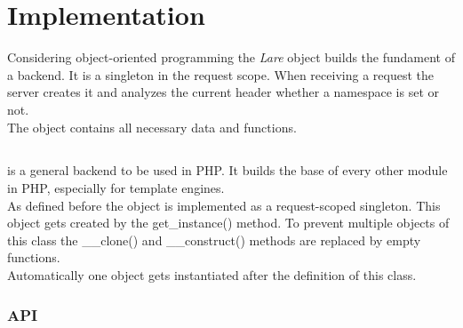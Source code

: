 \section{Implementation\label{chap:implementation}}

Considering object-oriented programming the \emph{Lare} object builds the fundament of a \lare{} backend.
It is a singleton in the request scope.
When receiving a request the server creates it and analyzes the current \http{} header whether a namespace is set or not.
\\
The \lare{} object contains all necessary data and functions.


\subsection{\phpLare{}}
\phpLare{} is a general \lare{} backend to be used in PHP.
It builds the base of every other \lare{} module in PHP, especially for template engines.
\\
As defined before the \lare{} object is implemented as a request-scoped singleton.
This object gets created by the get\_instance() method.
To prevent multiple objects of this class the \_\_clone() and  \_\_construct() methods are replaced by empty functions.
\\
Automatically one object gets instantiated after the definition of this class.


\subsubsection{API}

